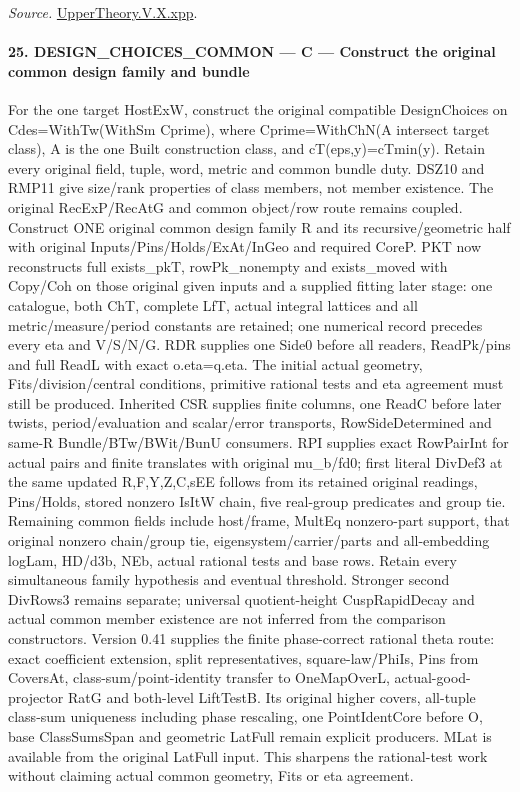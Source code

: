 \emph{Source.} \href{https://github.com/CocoSgt/riemann-hypothesis-lean/blob/7cbf7a0c32fca1badf05931879a37c3f8a2b03b4/src/Development/AutomorphicArithmetic/AutomorphicVarieties/LevelCohomology/Xpp.lean#L11-L84}{UpperTheory.V.X.xpp}.



\paragraph{25. DESIGN\_\allowbreak CHOICES\_\allowbreak COMMON — C — Construct the original common design family and bundle}

For the one target HostExW, construct the original compatible DesignChoices on Cdes=WithTw(WithSm Cprime), where Cprime=WithChN(A intersect target class), A is the one Built construction class, and cT(eps,y)=cTmin(y). Retain every original field, tuple, word, metric and common bundle duty. DSZ10 and RMP11 give size/rank properties of class members, not member existence. The original RecExP/RecAtG and common object/row route remains coupled. Construct ONE original common design family R and its recursive/geometric half with original Inputs/Pins/Holds/ExAt/InGeo and required CoreP. PKT now reconstructs full exists\_\allowbreak pkT, rowPk\_\allowbreak nonempty and exists\_\allowbreak moved with Copy/Coh on those original given inputs and a supplied fitting later stage: one catalogue, both ChT, complete LfT, actual integral lattices and all metric/measure/period constants are retained; one numerical record precedes every eta and V/S/N/G. RDR supplies one Side0 before all readers, ReadPk/pins and full ReadL with exact o.eta=q.eta. The initial actual geometry, Fits/division/central conditions, primitive rational tests and eta agreement must still be produced. Inherited CSR supplies finite columns, one ReadC before later twists, period/evaluation and scalar/error transports, RowSideDetermined and same-R Bundle/BTw/BWit/BunU consumers. RPI supplies exact RowPairInt for actual pairs and finite translates with original mu\_\allowbreak b/fd0; first literal DivDef3 at the same updated R,F,Y,Z,C,sEE follows from its retained original readings, Pins/Holds, stored nonzero IsItW chain, five real-group predicates and group tie. Remaining common fields include host/frame, MultEq nonzero-part support, that original nonzero chain/group tie, eigensystem/carrier/parts and all-embedding logLam, HD/d3b, NEb, actual rational tests and base rows. Retain every simultaneous family hypothesis and eventual threshold. Stronger second DivRows3 remains separate; universal quotient-height CuspRapidDecay and actual common member existence are not inferred from the comparison constructors. Version 0.41 supplies the finite phase-correct rational theta route: exact coefficient extension, split representatives, square-law/PhiIs, Pins from CoversAt, class-sum/point-identity transfer to OneMapOverL, actual-good-projector RatG and both-level LiftTestB. Its original higher covers, all-tuple class-sum uniqueness including phase rescaling, one PointIdentCore before O, base ClassSumsSpan and geometric LatFull remain explicit producers. MLat is available from the original LatFull input. This sharpens the rational-test work without claiming actual common geometry, Fits or eta agreement.
